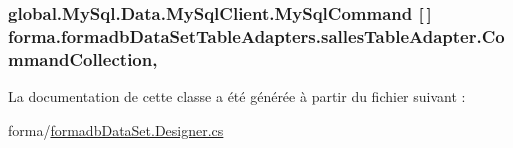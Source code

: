 \subsubsection[{\texorpdfstring{Command\+Collection}{CommandCollection}}]{\setlength{\rightskip}{0pt plus 5cm}global.\+My\+Sql.\+Data.\+My\+Sql\+Client.\+My\+Sql\+Command \mbox{[}$\,$\mbox{]} forma.\+formadb\+Data\+Set\+Table\+Adapters.\+salles\+Table\+Adapter.\+Command\+Collection\hspace{0.3cm}{\ttfamily [get]}, {\ttfamily [protected]}}\hypertarget{classforma_1_1formadb_data_set_table_adapters_1_1salles_table_adapter_ab4bf2eaf56788124614c9b02396e91d0}{}\label{classforma_1_1formadb_data_set_table_adapters_1_1salles_table_adapter_ab4bf2eaf56788124614c9b02396e91d0}


La documentation de cette classe a été générée à partir du fichier suivant \+:\begin{DoxyCompactItemize}
\item 
forma/\hyperlink{formadb_data_set_8_designer_8cs}{formadb\+Data\+Set.\+Designer.\+cs}\end{DoxyCompactItemize}
